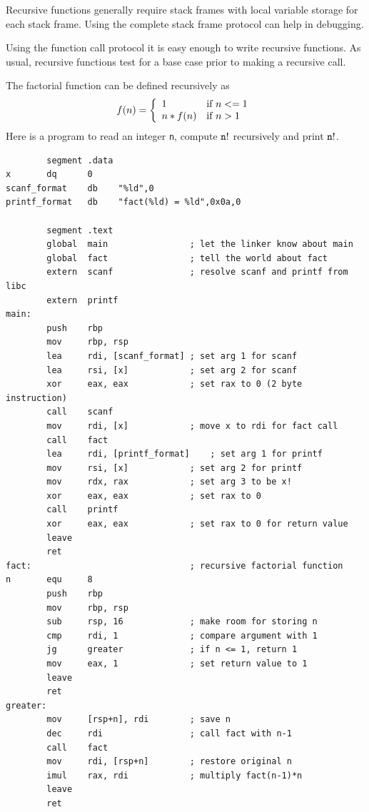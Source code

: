 \documentclass[11pt,b5paper]{book}
\begin{document}
Recursive functions generally require stack frames with local variable storage for each
stack frame.
Using the complete stack frame protocol can help in debugging.

Using the function call protocol it is easy enough to write recursive functions.
As usual, recursive functions test for a base case prior to making a recursive call.

The factorial function can be defined recursively as
$$f(n) = \left\{
   \begin{array}{l l}
       1 & \text{if $n <= 1$}\\
       n * f(n) & \text{if $n > 1$}
   \end{array}
   \right.
$$
Here is a program to read an integer {\tt n}, compute ${\tt n}!$ recursively
and print ${\tt n}!$.
\begin{verbatim}
        segment .data
x       dq      0
scanf_format    db    "%ld",0
printf_format   db    "fact(%ld) = %ld",0x0a,0

        segment .text
        global  main                ; let the linker know about main
        global  fact                ; tell the world about fact
        extern  scanf               ; resolve scanf and printf from libc
        extern  printf
main:
        push    rbp
        mov     rbp, rsp
        lea     rdi, [scanf_format] ; set arg 1 for scanf
        lea     rsi, [x]            ; set arg 2 for scanf
        xor     eax, eax            ; set rax to 0 (2 byte instruction)
        call    scanf
        mov     rdi, [x]            ; move x to rdi for fact call
        call    fact
        lea     rdi, [printf_format]    ; set arg 1 for printf
        mov     rsi, [x]            ; set arg 2 for printf
        mov     rdx, rax            ; set arg 3 to be x!
        xor     eax, eax            ; set rax to 0
        call    printf
        xor     eax, eax            ; set rax to 0 for return value
        leave
        ret
fact:                               ; recursive factorial function
n       equ     8
        push    rbp
        mov     rbp, rsp
        sub     rsp, 16             ; make room for storing n
        cmp     rdi, 1              ; compare argument with 1
        jg      greater             ; if n <= 1, return 1
        mov     eax, 1              ; set return value to 1
        leave
        ret
greater:
        mov     [rsp+n], rdi        ; save n
        dec     rdi                 ; call fact with n-1
        call    fact
        mov     rdi, [rsp+n]        ; restore original n
        imul    rax, rdi            ; multiply fact(n-1)*n
        leave
        ret
\end{verbatim}
\end{document}
